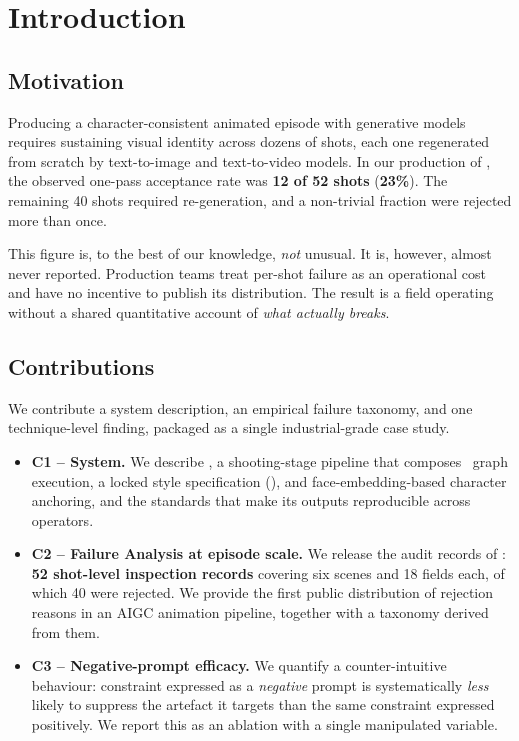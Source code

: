 \section{Introduction}

\subsection{Motivation}

Producing a character-consistent animated episode with generative models
requires sustaining visual identity across dozens of shots, each one
regenerated from scratch by text-to-image and text-to-video models. In our
production of \nts, the observed one-pass acceptance rate was
\textbf{12 of 52 shots}
(\textbf{23\%}). The remaining 40 shots required re-generation, and a
non-trivial fraction were rejected more than once.

This figure is, to the best of our knowledge, \emph{not} unusual. It is,
however, almost never reported. Production teams treat per-shot failure as an
operational cost and have no incentive to publish its distribution. The
result is a field operating without a shared quantitative account of
\emph{what actually breaks}.

\subsection{Contributions}

We contribute a system description, an empirical failure taxonomy, and one
technique-level finding, packaged as a single industrial-grade case study.

\begin{itemize}
  \item \textbf{C1 -- System.}
        We describe \agnes, a shooting-stage pipeline that composes
        \comfy\ graph execution, a locked style specification
        (\styledef), and face-embedding-based character anchoring, and
        the standards that make its outputs reproducible across operators.

  \item \textbf{C2 -- Failure Analysis at episode scale.}
        We release the audit records of \nts: \textbf{52 shot-level
        inspection records} covering six scenes and 18 fields each, of
        which 40 were rejected. We provide the first public distribution
        of rejection reasons in an AIGC animation pipeline, together with
        a taxonomy derived from them.

  \item \textbf{C3 -- Negative-prompt efficacy.}
        We quantify a counter-intuitive behaviour: constraint expressed
        as a \emph{negative} prompt is systematically \emph{less} likely
        to suppress the artefact it targets than the same constraint
        expressed positively. We report this as an ablation with a
        single manipulated variable.
\end{itemize}

